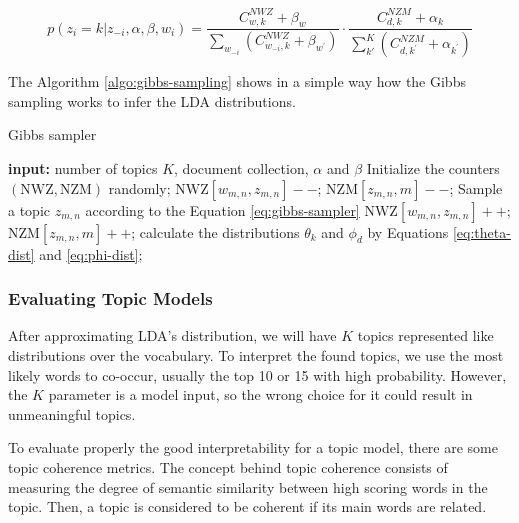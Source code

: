 	\begin{equation}
		\label{eq:gibbs-sampler}
		p(z_{i}=k|z_{-i}, \alpha, \beta, w_{i}) = \frac{C_{w,k}^{NWZ} + \beta_{w}} {\sum_{w_{-i}} \left(C_{w_{-i},k}^{NWZ} + \beta_{w^{'}} \right)} \cdot \frac{C_{d,k}^{NZM} + \alpha_{k}} {\sum_{k'}^{K} \left(C_{d,k^{'}}^{NZM} + \alpha_{k^{'}} \right)}
	\end{equation}
	
	The Algorithm \ref{algo:gibbs-sampling} shows in a simple way how the Gibbs sampling works to infer the LDA distributions.
	
	\begin{algorithm}[h!]
		\caption{Gibbs sampler} 
		\label{algo:gibbs-sampling}
		\begin{algorithmic}[1]
			\State \textbf{input:} number of topics $K$, document collection, $\alpha$ and $\beta$
			\Begin
			\State Initialize the counters $(\text{NWZ}, \text{NZM})$ randomly;
			\State $\text{NWZ}[w_{m,n}, z_{m,n}]--$; $\text{NZM}[z_{m,n},m]--$;
			\State Sample a topic $z_{m,n}$ according to the Equation \ref{eq:gibbs-sampler}
			\State $\text{NWZ}[w_{m,n}, z_{m,n}]++$; $\text{NZM}[z_{m,n},m]++$;
			\EndFor
			\EndFor
			\State calculate the distributions $\theta_{k}$ and $\phi_{d}$ by Equations \ref{eq:theta-dist} and \ref{eq:phi-dist};
			\EndIf
			\EndWhile
			\End
		\end{algorithmic} 
	\end{algorithm}	
	
	\subsubsection{Evaluating Topic Models}
	
	After approximating LDA's distribution, we will have $K$ topics represented like distributions over the vocabulary. To interpret the found topics, we use the most likely words to co-occur, usually the top 10 or 15 with high probability. However, the $K$ parameter is a model input, so the wrong choice for it could result in unmeaningful topics. 
	
	To evaluate properly the good interpretability for a topic model, there are some topic coherence metrics. The concept behind topic coherence consists of measuring the degree of semantic similarity between high scoring words in the topic. Then, a topic is considered to be coherent if its main words are related.
	
